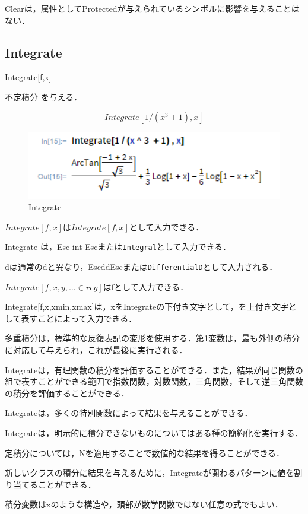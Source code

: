 Clearは，属性としてProtectedが与えられているシンボルに影響を与えることはない．

\clearpage

\subsection {Integrate}

Integrate[f,x]

不定積分 を与える．

\[Integrate[1/(x^3 + 1), x]\]

\begin{figure}[h]
\centering
\includegraphics[width=15cm]{integrate.png}
\caption{Integrate}\label{図}
\end{figure}

$Integrate[f,x]$は$Integrate[f,x]$として入力できる．

Integrate は，Esc int Escまたは\verb|Integral|として入力できる．

dは通常のdと異なり，EscddEscまたは\verb|DifferentialD|として入力される．

$Integrate[f,{x,y,…}∈reg]$はfとして入力できる．

Integrate[f,{x,xmin,xmax}]は，xをIntegrateの下付き文字として，を上付き文字として表すことによって入力できる．

多重積分は，標準的な反復表記の変形を使用する．第1変数は，最も外側の積分に対応して与えられ，これが最後に実行される． 

Integrateは，有理関数の積分を評価することができる．また，結果が同じ関数の組で表すことができる範囲で指数関数，対数関数，三角関数，そして逆三角関数の積分を評価することができる．

Integrateは，多くの特別関数によって結果を与えることができる．

Integrateは，明示的に積分できないものについてはある種の簡約化を実行する．

定積分については，Nを適用することで数値的な結果を得ることができる． 

新しいクラスの積分に結果を与えるために，Integrateが関わるパターンに値を割り当てることができる．

積分変数はxのような構造や，頭部が数学関数ではない任意の式でもよい．

